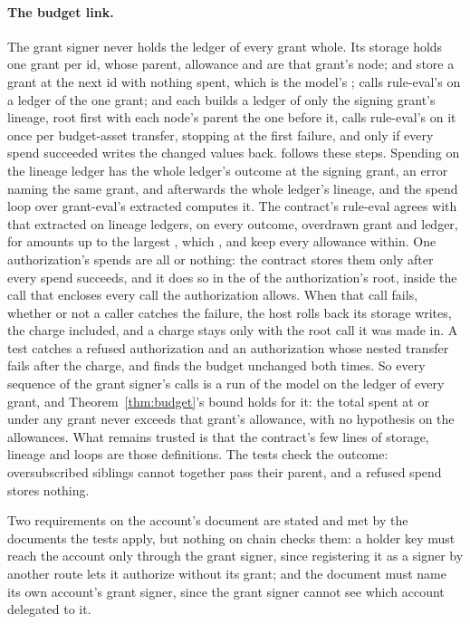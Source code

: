 \paragraph{The budget link.} The grant signer never holds the ledger of
every grant whole. Its storage holds one grant per id, whose parent,
allowance and  are that grant's node;  and
 store a grant at the next id with nothing spent, which is the
model's ;  calls rule-eval's  on a
ledger of the one grant; and each  builds a ledger of only
the signing grant's lineage, root first with each node's parent the one before
it, calls rule-eval's  on it once per budget-asset transfer, stopping
at the first failure, and only if every spend succeeded writes the changed
 values back.  follows
these steps. Spending on the lineage ledger has the whole ledger's outcome at
the signing grant, an error naming the same grant, and afterwards the whole
ledger's lineage, and the spend loop over grant-eval's extracted 
computes it. The contract's rule-eval 
agrees with that extracted  on lineage ledgers, on every outcome,
overdrawn grant and ledger, for amounts up to the largest , which
,  and  keep every allowance
within. One authorization's spends are all or nothing:
the contract stores them only after every spend succeeds, and it does so in
the  of the authorization's root, inside the call that
encloses every call the authorization allows. When that call fails, whether
or not a caller catches the failure, the host rolls back its storage writes,
the charge included, and a charge stays only with the root call it was made
in. A test catches a refused authorization and an authorization whose
nested transfer fails after the charge, and finds the budget unchanged both
times. So every sequence of the grant signer's calls is a run of the model on the
ledger of every grant, and Theorem~\ref{thm:budget}'s
bound holds for it: the total spent at or under any grant never exceeds that
grant's allowance, with no hypothesis on the
allowances. What remains trusted is that the
contract's few lines of storage, lineage and loops are those
definitions. The tests check the outcome:
oversubscribed siblings cannot together pass their parent, and a refused
spend stores nothing.

Two requirements on the account's document are stated and met by the
documents the tests apply, but nothing on chain checks them: a holder key must
reach the account only through the grant signer, since registering it as a
signer by another route lets it authorize without its grant; and the document
must name its own account's grant signer, since the grant signer cannot see
which account delegated to it.
